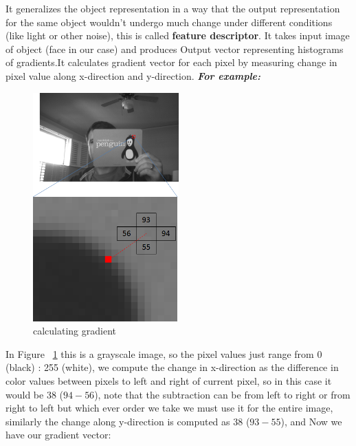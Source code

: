 It generalizes the object representation in a way that the output representation for the same object wouldn’t undergo much change under different conditions (like light or other noise), this is called \textbf{feature descriptor}.
It takes input image of object (face in our case) and produces Output vector representing histograms of gradients.\newline It calculates gradient vector for each pixel by measuring change in pixel value along x-direction and y-direction. \newline \newline \textbf{\textit{For example:}}\newline
\begin{figure}
    \centering
	\includegraphics[width=0.5\textwidth]{images/hog_pixel_ex.png}
	\caption{calculating gradient}
	\label{fig:calculating gradient}
\end{figure}
In Figure ~\ref{fig:calculating gradient} this is a grayscale image, so the pixel values just range from 0 (black) : 255 (white), we compute the change in x-direction as the difference in color values between pixels to left and right of current pixel, so in this case it would be 38 ($94 - 56$), note that the subtraction can be from left to right or from right to left but which ever order we take we must use it for the entire image, similarly the change along y-direction is computed as 38 ($93 - 55$), and Now we have our gradient vector:
